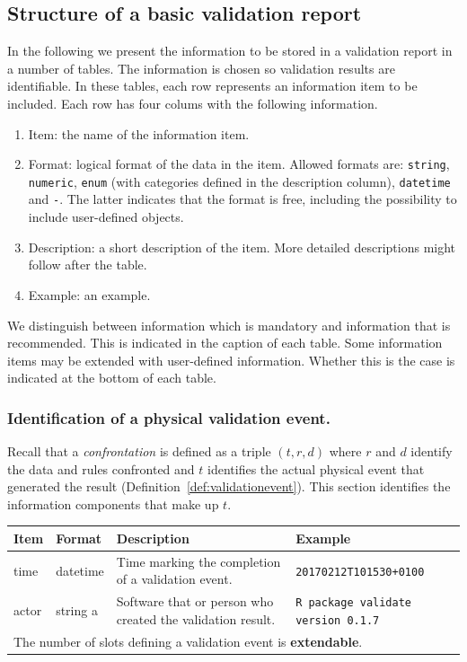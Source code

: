 \documentclass[a4paper, 11pt,titlepage]{article}
\newcommand{\code}[1]{\texttt{#1}}
\begin{document}
\subsection{Structure of a basic validation report}
\label{sect:basicreportstructure}
In the following we present the information to be stored in a validation report
in a number of tables. The information is chosen so validation results are
identifiable. In these tables, each row represents an information item to be
included. Each row has four colums with the following information.
%
\begin{enumerate}
\item Item: the name of the information item.
\item Format: logical format of the data in the item. Allowed formats are: \code{string},
\code{numeric}, \code{enum} (with categories defined in the description
column), \code{datetime} and \code{-}. The latter indicates that the format is
free, including the possibility to include user-defined objects.
\item Description: a short description of the item. More detailed descriptions
might follow after the table.
\item Example: an example.
\end{enumerate}
%
We distinguish between information which is mandatory and information that
is recommended. This is indicated in the caption of each table. Some
information items may be extended with user-defined information. Whether
this is the case is indicated at the bottom of each table.


\subsubsection{Identification of a physical validation event.}
\label{sect:idevent}
Recall that a \emph{confrontation} is defined as a triple $(t,r,d)$ where $r$
and $d$ identify the data and rules confronted and $t$ identifies the actual
physical event that generated the result
(Definition~\ref{def:validationevent}).  This section identifies the
information components that make up $t$.
%
\begin{center}
\label{tab:idve}
\begin{tabular}{|lp{15mm}p{}p{}|}
\hline
\textbf{Item} & \textbf{Format} & \textbf{Description} &\textbf{Example}\\
\hline
time          & datetime & Time marking the completion of a validation event. & \code{20170212T101530+0100}\\
actor         & string        a  & Software that or person who created the validation result. & \code{R package validate version 0.1.7}\\
\hline
\multicolumn{4}{|l|}{The number of slots defining a validation event is \textbf{extendable}.
}\\
\hline
\end{tabular}
\end{center}
\end{document}
